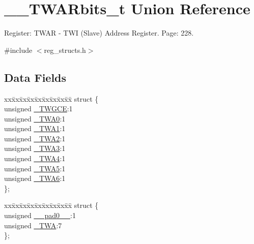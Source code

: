 \hypertarget{union_____t_w_a_rbits__t}{\section{\+\_\+\+\_\+\+T\+W\+A\+Rbits\+\_\+t Union Reference}
\label{union_____t_w_a_rbits__t}
}


Register\+: T\+W\+A\+R -\/ T\+W\+I (Slave) Address Register. Page\+: 228.  




{\ttfamily \#include $<$reg\+\_\+structs.\+h$>$}

\subsection*{Data Fields}
\begin{DoxyCompactItemize}
\item 
\begin{tabbing}
xx\=xx\=xx\=xx\=xx\=xx\=xx\=xx\=xx\=\kill
struct \{\\
\>unsigned \hyperlink{union_____t_w_a_rbits__t_a0f95198aeabe1a4ec6b1d1cc79a081aa}{\_TWGCE}:1\\
\>unsigned \hyperlink{union_____t_w_a_rbits__t_a2b79f05616a44f3b8597df0852ee050c}{\_TWA0}:1\\
\>unsigned \hyperlink{union_____t_w_a_rbits__t_ae70907d38eee68d038bcb5f78b59586d}{\_TWA1}:1\\
\>unsigned \hyperlink{union_____t_w_a_rbits__t_a2b95119bab245c7a20fe550c52dc6bce}{\_TWA2}:1\\
\>unsigned \hyperlink{union_____t_w_a_rbits__t_a9185f927b078d32acde9602189659714}{\_TWA3}:1\\
\>unsigned \hyperlink{union_____t_w_a_rbits__t_a061ed073789b2a81c9bde34c252fe8b9}{\_TWA4}:1\\
\>unsigned \hyperlink{union_____t_w_a_rbits__t_abc4ba1e62c3976eff8e834f29a1c8a12}{\_TWA5}:1\\
\>unsigned \hyperlink{union_____t_w_a_rbits__t_a16f85f6b34909395008a809848d73575}{\_TWA6}:1\\
\}; \\

\end{tabbing}\item 
\begin{tabbing}
xx\=xx\=xx\=xx\=xx\=xx\=xx\=xx\=xx\=\kill
struct \{\\
\>unsigned \hyperlink{union_____t_w_a_rbits__t_a191540c737be70afad53dfd5e1b41457}{\_\_pad0\_\_}:1\\
\>unsigned \hyperlink{union_____t_w_a_rbits__t_a7c9cbfd889b9879a1f40483dd7c6babd}{\_TWA}:7\\
\}; \\


\end{tabbing}
\end{DoxyCompactItemize}
